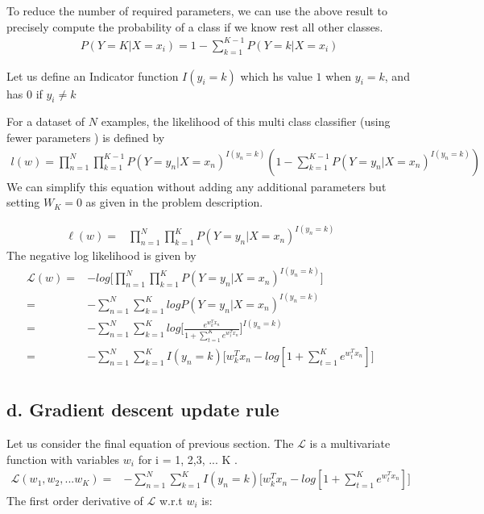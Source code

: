 \documentclass[letterpaper,doc,notimes]{apa6}
\begin{document}
{To reduce the number of required parameters, we can use the above result to precisely compute the probability of a class if we know rest all other classes.
\begin{align*}
	P(Y = K | X = x_i) = 1 - \sum_{k=1}^{K-1} P(Y = k | X = x_i)
\end{align*}

Let us define an Indicator function
 $I(y_i = k)$ which hs value $1$ when $y_i = k$, and has $0$ if $y_i \ne k$ 

For a dataset of $N$ examples, the likelihood of this multi class classifier (using fewer parameters ) is defined by
\begin{align*}
	l(w) = \prod_{n=1}^{N} \prod_{k=1}^{K-1} P(Y = y_n | X = x_n ) ^ {I(y_n=k)} (1 - \sum_{k=1}^{K-1} P(Y = y_n | X = x_n ) ^ {I(y_n=k)})
\end{align*}
We can simplify this equation without adding any additional parameters but setting $W_K=0$ as given in the problem description.

\begin{align*}
	\ell (w) = & \prod_{n=1}^{N} \prod_{k=1}^{K} P(Y = y_n | X = x_n )^{I(y_n = k)} & &
\end{align*}
The negative log likelihood is given by
\begin{align*}
  \mathcal{L}(w) = & - log \bigg [ \prod_{n=1}^{N} \prod_{k=1}^{K} P(Y = y_n | X = x_n )^{I(y_n = k)} \bigg]  & & \\
	   = & - \sum_{n=1}^{N} \sum_{k=1}^{K} log P(Y = y_n | X = x_n ) ^{I(y_n = k)}  & & \\
	   = & - \sum_{n=1}^{N} \sum_{k=1}^{K} log \bigg[ \frac{e^{w_k^Tx_n}}{1 + \sum_{t=1}^{K} e^{w_t^Tx_n}}  \bigg]^{I(y_n = k)}  & & \\
	   = & - \sum_{n=1}^{N} \sum_{k=1}^{K} I(y_n = k) \bigg[ w_k^Tx_n - log [1 +  \sum_{t=1}^{K} e^{w_t^Tx_n} ] \bigg]  & & \\
\end{align*}

\subsection{d. Gradient descent update rule}
Let us consider the final equation of previous section.
The $\mathcal{L}$ is a multivariate function with variables $w_i$ for i = 1, 2,3, ... K . \\

\begin{align*}
	\mathcal{L}(w_1, w_2, ...w_K ) = & - \sum_{n=1}^{N} \sum_{k=1}^{K} I(y_n = k) \bigg[ w_k^Tx_n - log [1 +  \sum_{t=1}^{K} e^{w_t^Tx_n} ] \bigg] 
\end{align*}
The first order derivative of $\mathcal{L}$ w.r.t $w_i$ is:

}
\end{document}
